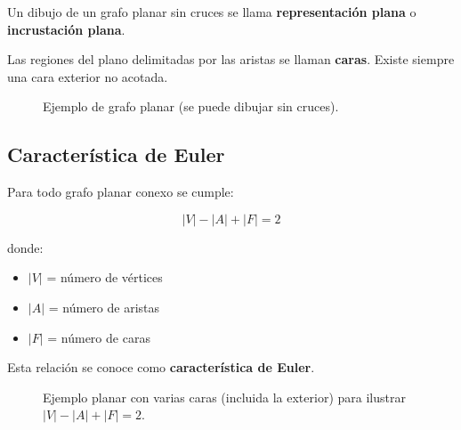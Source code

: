 \documentclass[12pt]{article}
\theoremstyle{plain}
\theoremstyle{definition}
\theoremstyle{remark}
\begin{document}
Un dibujo de un grafo planar sin cruces se llama \textbf{representación plana} o \textbf{incrustación plana}.

Las regiones del plano delimitadas por las aristas se llaman \textbf{caras}.  
Existe siempre una cara exterior no acotada.

\begin{figure}[htbp]
\centering
{}
\caption{Ejemplo de grafo planar (se puede dibujar sin cruces).}
\end{figure}

\subsection*{Característica de Euler}

Para todo grafo planar conexo se cumple:

\[
|V| - |A| + |F| = 2
\]

donde:

\begin{itemize}
    \item $|V|$ = número de vértices
    \item $|A|$ = número de aristas
    \item $|F|$ = número de caras
\end{itemize}

Esta relación se conoce como \textbf{característica de Euler}.

\begin{figure}[htbp]
\centering
{}
\caption{Ejemplo planar con varias caras (incluida la exterior) para ilustrar $|V|-|A|+|F|=2$.}
\end{figure}
\end{document}
